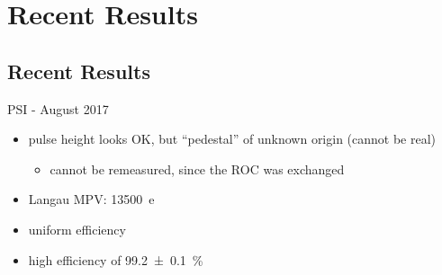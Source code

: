 \section{Recent Results}
\subsection{Recent Results}
\begin{frame}{PSI - August 2017}

	
	\begin{itemize}\itemfill
		\item<1-> pulse height looks OK, but ``pedestal'' of unknown origin (cannot be real)
		\begin{itemize}
			\item<1-> cannot be remeasured, since the ROC was exchanged 
		\end{itemize}
		\item<1-> Langau MPV: \SI{13500}{e}
		\item<1-> uniform efficiency
		\item<2> high efficiency of \SI{99.2\pm.1}{\%}
	\end{itemize}
	
\end{frame}
